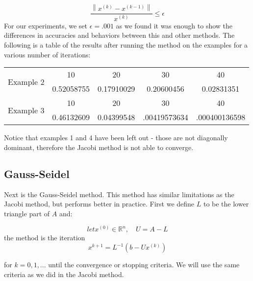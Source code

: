 \documentclass[11pt]{article}	%
\newcommand\norm[1]{\left\lVert#1\right\rVert}
\begin{document}
    \begin{equation}
        \frac{\norm{x^{(k)} - x^{(k-1)}}}{x^{(k)}} \leq \epsilon
    \end{equation}
    For our experiments, we set $\epsilon = .001$ as we found it was enough to show the differences in accuracies and behaviors between this and other methods. The following is a table of the results after running the method on the examples for a various number of iterations:
    \begin{center}
        \begin{tabular}{||c|c|c|c|c||}
            \hline
            \multirow{2}{5em}{Example 2} & 10 & 20 & 30 & 40 \\ [.25em]
            & 0.52058755 & 0.17910029 & 0.20600456 & 0.02831351 \\ [.25em]
            \hline \hline
            \multirow{2}{5em}{Example 3} & 10 & 20 & 30 & 40 \\ [.25em]
            & 0.46132609 & 0.04399548 & .00419573634 & .000400136598 \\ [.25em]
            \hline
        \end{tabular}
    \end{center}

    Notice that examples 1 and 4 have been left out - those are not diagonally dominant, therefore the Jacobi method
    is not able to converge.

\subsection{Gauss-Seidel}
Next is the Gauss-Seidel method. This method has similar limitations as the Jacobi method, but performs better in practice.
First we define $L$ to be the lower triangle part of $A$ and:

\begin{equation}\label{eq:jacobi-eq-1}
    let x^{(0)}\in {\mathbb R}^n, \quad U = A - L
\end{equation}
the method is the iteration
\begin{equation}\label{eq:jacobi-eq-1}
    x^{k+1} = L^{-1}(b - Ux^{(k)})
\end{equation}

for $k = 0, 1, ...$ until the convergence or stopping criteria. We will use the same criteria as we did in the Jacobi method.
\end{document}
